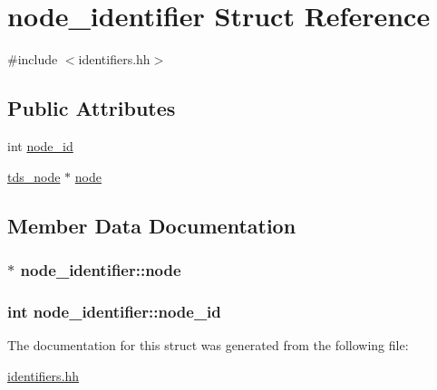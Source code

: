\hypertarget{structnode__identifier}{}\section{node\+\_\+identifier Struct Reference}
\label{structnode__identifier}


{\ttfamily \#include $<$identifiers.\+hh$>$}

\subsection*{Public Attributes}
\begin{DoxyCompactItemize}
\item 
int \hyperlink{structnode__identifier_aeb6689eabdda3bc30e7c385940fbdf23}{node\+\_\+id}
\item 
\hyperlink{classtds__node}{tds\+\_\+node} $\ast$ \hyperlink{structnode__identifier_ac7c3a08e75cfd2cec2decd099c1577b3}{node}
\end{DoxyCompactItemize}


\subsection{Member Data Documentation}
\subsubsection[{\texorpdfstring{node}{node}}]{$\ast$ node\+\_\+identifier\+::node}\hypertarget{structnode__identifier_ac7c3a08e75cfd2cec2decd099c1577b3}{}\label{structnode__identifier_ac7c3a08e75cfd2cec2decd099c1577b3}
\subsubsection[{\texorpdfstring{node\+\_\+id}{node_id}}]{\setlength{\rightskip}{0pt plus 5cm}int node\+\_\+identifier\+::node\+\_\+id}\hypertarget{structnode__identifier_aeb6689eabdda3bc30e7c385940fbdf23}{}\label{structnode__identifier_aeb6689eabdda3bc30e7c385940fbdf23}


The documentation for this struct was generated from the following file\+:\begin{DoxyCompactItemize}
\item 
\hyperlink{identifiers_8hh}{identifiers.\+hh}\end{DoxyCompactItemize}
